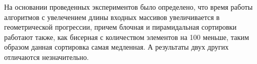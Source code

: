 \documentclass[a4paper,14pt, unknownkeysallowed]{extreport}
\begin{document}
На основании проведенных экспериментов было определено, что время работы алгоритмов с увелечением длины входных массивов увеличивается в геометрической прогрессии, причем блочная и пирамидальная сортировки работают также, как бисерная с количеством элементов на 100 меньше, таким образом данная сортировка самая медленная. А результаты двух других отличаются незначительно.
	

\nocite{*} 

\renewcommand\bibname{Список использованных источников} %
	
\end{document}
